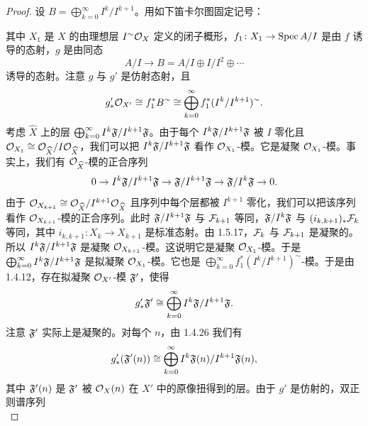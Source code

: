 \begin{proof}
设 $B=\bigoplus_{k=0}^{\infty}I^k/I^{k+1}$。用如下笛卡尔图固定记号：
\begin{center}
\end{center}
其中 $X_1$ 是 $X$ 的由理想层 $I^{\sim}\mathcal{O}_X$ 定义的闭子概形，$f_1\colon X_1\to\operatorname{Spec} A/I$ 是由 $f$ 诱导的态射，$g$ 是由同态
\begin{equation*}
A/I\to B=A/I\oplus I/I^2\oplus\cdots
\end{equation*}
诱导的态射。注意 $g$ 与 $g'$ 是仿射态射，且
\begin{equation*}
g'_*\mathcal{O}_{X'}\cong f_1^*B^{\sim}\cong\bigoplus_{k=0}^{\infty}f_1^*(I^k/I^{k+1})^{\sim}.
\end{equation*}
考虑 $\widehat{X}$ 上的层 $\bigoplus_{k=0}^{\infty}I^k\mathfrak{F}/I^{k+1}\mathfrak{F}$。由于每个 $I^k\mathfrak{F}/I^{k+1}\mathfrak{F}$ 被 $I$ 零化且 $\mathcal{O}_{X_1}\cong\mathcal{O}_{\widehat{X}}/I\mathcal{O}_{\widehat{X}}$，我们可以把 $I^k\mathfrak{F}/I^{k+1}\mathfrak{F}$ 看作 $\mathcal{O}_{X_1}$-模。它是凝聚 $\mathcal{O}_{X_1}$-模。事实上，我们有 $\mathcal{O}_{\widehat{X}}$-模的正合序列
\begin{equation*}
0\to I^k\mathfrak{F}/I^{k+1}\mathfrak{F}\to\mathfrak{F}/I^{k+1}\mathfrak{F}\to\mathfrak{F}/I^k\mathfrak{F}\to 0.
\end{equation*}
由于 $\mathcal{O}_{X_{k+1}}\cong\mathcal{O}_{\widehat{X}}/I^{k+1}\mathcal{O}_{\widehat{X}}$ 且序列中每个层都被 $I^{k+1}$ 零化，我们可以把该序列看作 $\mathcal{O}_{X_{k+1}}$-模的正合序列。此时 $\mathfrak{F}/I^{k+1}\mathfrak{F}$ 与 $\mathcal{F}_{k+1}$ 等同，$\mathfrak{F}/I^k\mathfrak{F}$ 与 $(i_{k,k+1})_*\mathcal{F}_k$ 等同，其中 $i_{k,k+1}\colon X_k\to X_{k+1}$ 是标准态射。由 1.5.17，$\mathcal{F}_k$ 与 $\mathcal{F}_{k+1}$ 是凝聚的。所以 $I^k\mathfrak{F}/I^{k+1}\mathfrak{F}$ 是凝聚 $\mathcal{O}_{X_{k+1}}$-模。这说明它是凝聚 $\mathcal{O}_{X_1}$-模。于是 $\bigoplus_{k=0}^{\infty}I^k\mathfrak{F}/I^{k+1}\mathfrak{F}$ 是拟凝聚 $\mathcal{O}_{X_1}$-模。它也是 $\bigoplus_{k=0}^{\infty}f_1^*(I^k/I^{k+1})^{\sim}$-模。于是由 1.4.12，存在拟凝聚 $\mathcal{O}_{X'}$-模 $\mathfrak{F}'$，使得
\begin{equation*}
g'_*\mathfrak{F}'\cong\bigoplus_{k=0}^{\infty}I^k\mathfrak{F}/I^{k+1}\mathfrak{F}.
\end{equation*}
注意 $\mathfrak{F}'$ 实际上是凝聚的。对每个 $n$，由 1.4.26 我们有
\begin{equation*}
g'_*(\mathfrak{F}'(n))\cong\bigoplus_{k=0}^{\infty}I^k\mathfrak{F}(n)/I^{k+1}\mathfrak{F}(n),
\end{equation*}
其中 $\mathfrak{F}'(n)$ 是 $\mathfrak{F}'$ 被 $\mathcal{O}_X(n)$ 在 $X'$ 中的原像扭得到的层。由于 $g'$ 是仿射的，双正则谱序列
\begin{equation*}

\end{equation*}
\end{proof}
